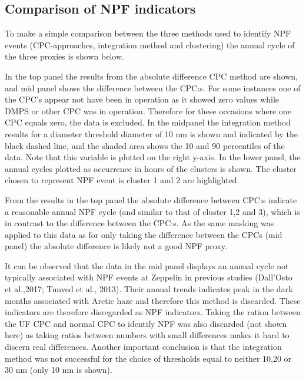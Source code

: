 \documentclass[11pt]{article}
\begin{document}
    \hypertarget{comparison-of-npf-indicators}{%
\subsection{Comparison of NPF
indicators}\label{comparison-of-npf-indicators}}

    To make a simple comparison between the three methods used to identify
NPF events (CPC-approaches, integration method and clustering) the
annual cycle of the three proxies is shown below.

In the top panel the results from the absolute difference CPC method are
shown, and mid panel shows the difference between the CPC:s. For some
instances one of the CPC's appear not have been in operation as it
showed zero values while DMPS or other CPC was in operation. Therefore
for these occasions where one CPC equals zero, the data is excluded. In
the midpanel the integration method results for a diameter threshold
diameter of 10 nm is shown and indicated by the black dashed line, and
the shaded area shows the 10 and 90 percentiles of the data. Note that
this variable is plotted on the right y-axis. In the lower panel, the
annual cycles plotted as occurrence in hours of the clusters is shown.
The cluster chosen to represent NPF event is cluster 1 and 2 are
highlighted.

From the results in the top panel the absolute difference between CPC:s
indicate a reasonable annual NPF cycle (and similar to that of cluster
1,2 and 3), which is in contrast to the difference between the CPC:s. As
the same masking was applied to this data as for only taking the
difference between the CPCs (mid panel) the absolute difference is
likely not a good NPF proxy.

It can be observed that the data in the mid panel displays an annual
cycle not typically associated with NPF events at Zeppelin in previous
studies (Dall'Osto et al.,2017; Tunved et al., 2013). Their annual
trends indicates peak in the dark months associated with Arctic haze and
therefore this method is discarded. These indicators are therefore
disregarded as NPF indicators. Taking the ration between the UF CPC and
normal CPC to identify NPF was also discarded (not shown here) as taking
ratios between numbers with small differences makes it hard to discern
real differences. Another important conclusion is that the integration
method was not successful for the choice of thresholds equal to neither
10,20 or 30 nm (only 10 nm is shown).
\end{document}
